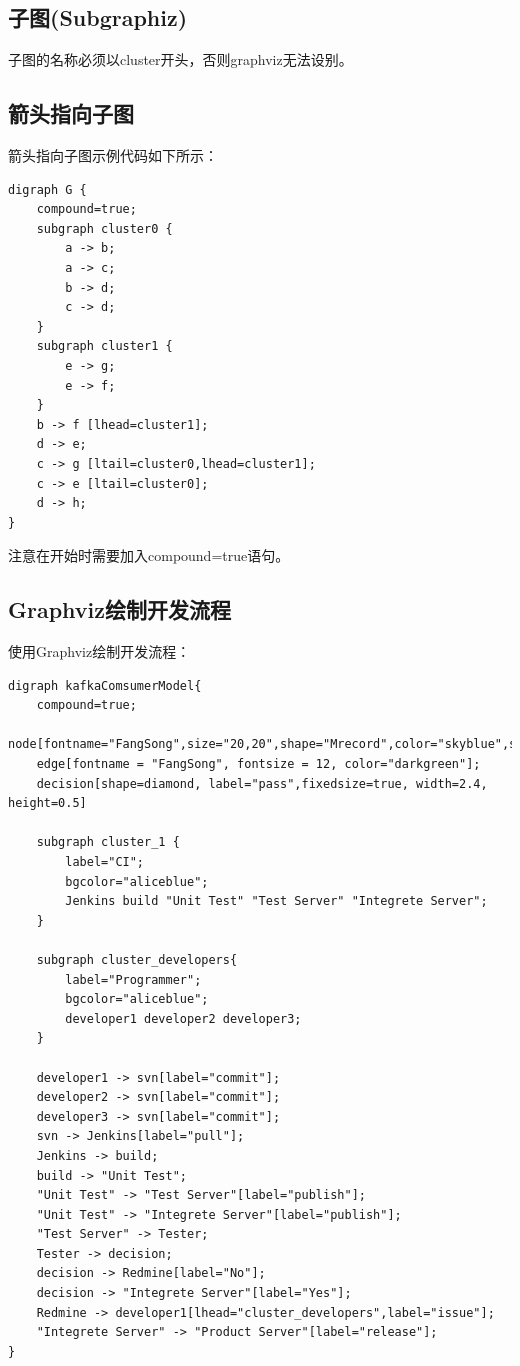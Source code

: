 \documentclass{book}
\begin{document}
\subsection{子图(Subgraphiz)}

子图的名称必须以cluster开头，否则graphviz无法设别。

\subsection{箭头指向子图}

箭头指向子图示例代码如下所示：

\begin{lstlisting}
digraph G {
	compound=true;
	subgraph cluster0 {
		a -> b;
		a -> c;
		b -> d;
		c -> d;
	}
	subgraph cluster1 {
		e -> g;
		e -> f;
	}
	b -> f [lhead=cluster1];
	d -> e;
	c -> g [ltail=cluster0,lhead=cluster1];
	c -> e [ltail=cluster0];
	d -> h;
}
\end{lstlisting}

注意在开始时需要加入compound=true语句。

\subsection{Graphviz绘制开发流程}

使用Graphviz绘制开发流程：

\begin{lstlisting}
digraph kafkaComsumerModel{ 
	compound=true;
	node[fontname="FangSong",size="20,20",shape="Mrecord",color="skyblue",style="filled"];  
	edge[fontname = "FangSong", fontsize = 12, color="darkgreen"];
	decision[shape=diamond, label="pass",fixedsize=true, width=2.4, height=0.5]
	
	subgraph cluster_1 {
		label="CI";
		bgcolor="aliceblue";
		Jenkins build "Unit Test" "Test Server" "Integrete Server";
	}  
	
	subgraph cluster_developers{
		label="Programmer";
		bgcolor="aliceblue";
		developer1 developer2 developer3;
	}
	
	developer1 -> svn[label="commit"];
	developer2 -> svn[label="commit"];
	developer3 -> svn[label="commit"];
	svn -> Jenkins[label="pull"];
	Jenkins -> build;
	build -> "Unit Test";
	"Unit Test" -> "Test Server"[label="publish"];
	"Unit Test" -> "Integrete Server"[label="publish"];
	"Test Server" -> Tester;  
	Tester -> decision;
	decision -> Redmine[label="No"];
	decision -> "Integrete Server"[label="Yes"];
	Redmine -> developer1[lhead="cluster_developers",label="issue"];  
	"Integrete Server" -> "Product Server"[label="release"];
}
\end{lstlisting}
\end{document}
